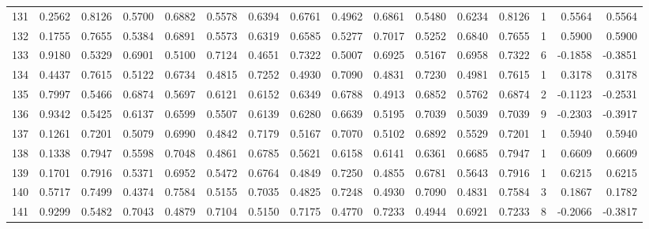 \begin{tabular}{lrrrrrrrrrrrrrrr}
131 &      0.2562 &  0.8126 &  0.5700 &  0.6882 &  0.5578 &  0.6394 &  0.6761 &  0.4962 &  0.6861 &  0.5480 &   0.6234 &     0.8126 &      1 &                    0.5564 &                     0.5564 \\
132 &      0.1755 &  0.7655 &  0.5384 &  0.6891 &  0.5573 &  0.6319 &  0.6585 &  0.5277 &  0.7017 &  0.5252 &   0.6840 &     0.7655 &      1 &                    0.5900 &                     0.5900 \\
133 &      0.9180 &  0.5329 &  0.6901 &  0.5100 &  0.7124 &  0.4651 &  0.7322 &  0.5007 &  0.6925 &  0.5167 &   0.6958 &     0.7322 &      6 &                   -0.1858 &                    -0.3851 \\
134 &      0.4437 &  0.7615 &  0.5122 &  0.6734 &  0.4815 &  0.7252 &  0.4930 &  0.7090 &  0.4831 &  0.7230 &   0.4981 &     0.7615 &      1 &                    0.3178 &                     0.3178 \\
135 &      0.7997 &  0.5466 &  0.6874 &  0.5697 &  0.6121 &  0.6152 &  0.6349 &  0.6788 &  0.4913 &  0.6852 &   0.5762 &     0.6874 &      2 &                   -0.1123 &                    -0.2531 \\
136 &      0.9342 &  0.5425 &  0.6137 &  0.6599 &  0.5507 &  0.6139 &  0.6280 &  0.6639 &  0.5195 &  0.7039 &   0.5039 &     0.7039 &      9 &                   -0.2303 &                    -0.3917 \\
137 &      0.1261 &  0.7201 &  0.5079 &  0.6990 &  0.4842 &  0.7179 &  0.5167 &  0.7070 &  0.5102 &  0.6892 &   0.5529 &     0.7201 &      1 &                    0.5940 &                     0.5940 \\
138 &      0.1338 &  0.7947 &  0.5598 &  0.7048 &  0.4861 &  0.6785 &  0.5621 &  0.6158 &  0.6141 &  0.6361 &   0.6685 &     0.7947 &      1 &                    0.6609 &                     0.6609 \\
139 &      0.1701 &  0.7916 &  0.5371 &  0.6952 &  0.5472 &  0.6764 &  0.4849 &  0.7250 &  0.4855 &  0.6781 &   0.5643 &     0.7916 &      1 &                    0.6215 &                     0.6215 \\
140 &      0.5717 &  0.7499 &  0.4374 &  0.7584 &  0.5155 &  0.7035 &  0.4825 &  0.7248 &  0.4930 &  0.7090 &   0.4831 &     0.7584 &      3 &                    0.1867 &                     0.1782 \\
141 &      0.9299 &  0.5482 &  0.7043 &  0.4879 &  0.7104 &  0.5150 &  0.7175 &  0.4770 &  0.7233 &  0.4944 &   0.6921 &     0.7233 &      8 &                   -0.2066 &                    -0.3817 \\

\end{tabular}
